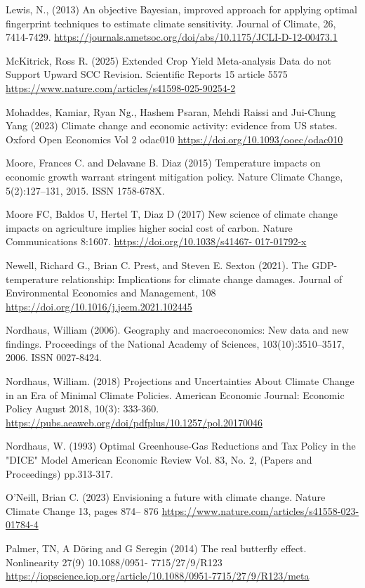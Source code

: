 \documentclass[12pt,paper=a4,DIV=12,parskip=never,chapterprefix=false,headings=standardclasses]{scrreprt}
\begin{document}
Lewis, N., (2013) An objective Bayesian, improved approach for applying optimal fingerprint techniques
to estimate climate sensitivity. Journal of Climate, 26, 7414-7429.
\url{https://journals.ametsoc.org/doi/abs/10.1175/JCLI-D-12-00473.1}

McKitrick, Ross R. (2025) Extended Crop Yield Meta-analysis Data do not Support Upward SCC
Revision. Scientific Reports 15 article 5575 \url{https://www.nature.com/articles/s41598-025-90254-2}

Mohaddes, Kamiar, Ryan Ng., Hashem Psaran, Mehdi Raissi and Jui-Chung Yang (2023) Climate change
and economic activity: evidence from US states. Oxford Open Economics Vol 2 odac010
\url{https://doi.org/10.1093/ooec/odac010}

Moore, Frances C. and Delavane B. Diaz (2015) Temperature impacts on economic growth warrant
stringent mitigation policy. Nature Climate Change, 5(2):127–131, 2015. ISSN 1758-678X.

Moore FC, Baldos U, Hertel T, Diaz D (2017) New science of climate change impacts on agriculture
implies higher social cost of carbon. Nature Communications 8:1607. \url{https://doi.org/10.1038/s41467-
017-01792-x}

Newell, Richard G., Brian C. Prest, and Steven E. Sexton (2021). The GDP-temperature relationship:
Implications for climate change damages. Journal of Environmental Economics and Management, 108
\url{https://doi.org/10.1016/j.jeem.2021.102445}

Nordhaus, William (2006). Geography and macroeconomics: New data and new findings. Proceedings of
the National Academy of Sciences, 103(10):3510–3517, 2006. ISSN 0027-8424.

Nordhaus, William. (2018) Projections and Uncertainties About Climate Change in an Era of Minimal
Climate Policies. American Economic Journal: Economic Policy August 2018, 10(3): 333-360.
\url{https://pubs.aeaweb.org/doi/pdfplus/10.1257/pol.20170046}

Nordhaus, W. (1993) Optimal Greenhouse-Gas Reductions and Tax Policy in the "DICE" Model
American Economic Review Vol. 83, No. 2, (Papers and Proceedings) pp.313-317.

O’Neill, Brian C. (2023) Envisioning a future with climate change. Nature Climate Change 13, pages 874–
876 \url{https://www.nature.com/articles/s41558-023-01784-4}

Palmer, TN, A Döring and G Seregin (2014) The real butterfly effect. Nonlinearity 27(9) 10.1088/0951-
7715/27/9/R123 \url{https://iopscience.iop.org/article/10.1088/0951-7715/27/9/R123/meta}
\end{document}
